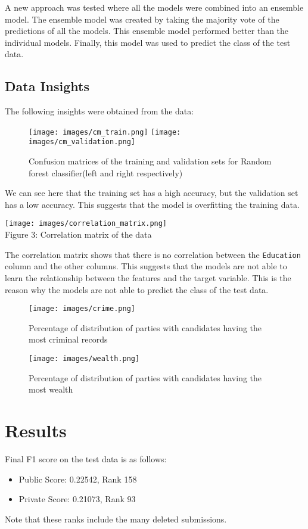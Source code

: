 \documentclass{article}
\begin{document}
A new approach was tested where all the models were combined into an ensemble model. The ensemble model was created by taking the majority vote of the predictions of all the models. This ensemble model performed better than the individual models. Finally, this model was used to predict the class of the test data.

\subsection{Data Insights}
The following insights were obtained from the data:


\begin{figure}[h!]
    \centering
    \texttt{[image: images/cm\_train.png]}
    \texttt{[image: images/cm\_validation.png]}
    \caption{Confusion matrices of the training and validation sets for Random forest classifier(left and right respectively)}
\end{figure}
We can see here that the training set has a high accuracy, but the validation set has a low accuracy. This suggests that the model is overfitting the training data.

\begin{center}
    \texttt{[image: images/correlation\_matrix.png]}\\
    Figure 3: Correlation matrix of the data
\end{center}

The correlation matrix shows that there is no correlation between the \texttt{Education} column and the other columns. This suggests that the models are not able to learn the relationship between the features and the target variable. This is the reason why the models are not able to predict the class of the test data.

\addtocounter{figure}{1}
\begin{figure}[h!]
    \centering
    \texttt{[image: images/crime.png]}
    \caption{Percentage of distribution of parties with candidates having the most criminal records}
\end{figure}

\begin{figure}[h!]
    \centering
    \texttt{[image: images/wealth.png]}
    \caption{Percentage of distribution of parties with candidates having the most wealth}
\end{figure}
\pagebreak
\section{Results}
Final F1 score on the test data is as follows:
\begin{itemize}
    \item Public Score: 0.22542, Rank 158
    \item Private Score: 0.21073, Rank 93
\end{itemize}
Note that these ranks include the many deleted submissions.
\end{document}
